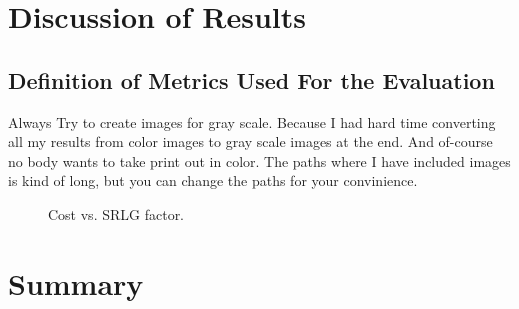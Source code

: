 \section{Discussion of Results}
\subsection{Definition of Metrics Used For the Evaluation}
Always Try to create images for gray scale. Because I had hard time converting all my results from color images to gray scale images at the end. And of-course no body wants to take print out in color.   The paths where I have included images is kind of long, but you can change the paths for your convinience. 
 \begin{figure}[H]
\centering
{}
\caption{ Cost vs. SRLG factor.}
\label{fig:before4}
\end{figure}

\section{Summary}
  